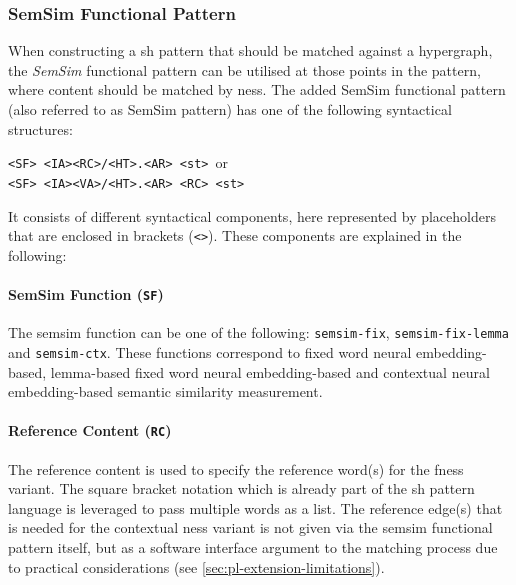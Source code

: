 \documentclass[11pt]{scrreprt}
\begin{document}
\subsubsection{SemSim Functional Pattern}
When constructing a \gls{sh} pattern that should be matched against a hypergraph, the \textit{SemSim} functional pattern can be utilised at those points in the pattern, where content should be matched by \gls{ness}. The added SemSim functional pattern (also referred to as SemSim pattern) has one of the following syntactical structures:

\begin{center}
	\texttt{<SF> <IA><RC>/<HT>.<AR> <\gls{st}>}\ or \\
	\texttt{<SF> <IA><VA>/<HT>.<AR> <RC> <\gls{st}>}\
\end{center}

It consists of different syntactical components, here represented by placeholders that are enclosed in brackets (\texttt{<>}). These components are explained in the following:

\paragraph{SemSim Function (\texttt{SF})}
 The semsim function can be one of the following: \texttt{semsim-fix}, \texttt{semsim-fix-lemma} and \texttt{semsim-ctx}. These functions correspond to fixed word neural embedding-based, lemma-based fixed word neural embedding-based and contextual neural embedding-based semantic similarity measurement.

\paragraph{Reference Content (\texttt{RC})} 
The reference content is used to specify the reference word(s) for the \gls{fness} variant. The square bracket notation which is already part of the \gls{sh} pattern language is leveraged to pass multiple words as a list. The reference edge(s) that is needed for the contextual \gls{ness} variant is not given via the semsim functional pattern itself, but as a software interface argument to the matching process due to practical considerations (see \cref{sec:pl-extension-limitations}).
\end{document}
